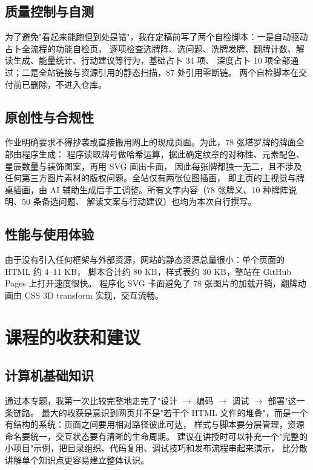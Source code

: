 \documentclass[supercite]{Experimental_Report}
\begin{document}
\subsection{质量控制与自测}

为了避免"看起来能跑但到处是错"，我在定稿前写了两个自检脚本：一是自动驱动占卜全流程的功能自检页，
逐项检查选牌阵、选问题、洗牌发牌、翻牌计数、解读生成、能量统计、行动建议等行为，基础占卜 34 项、
深度占卜 10 项全部通过；二是全站链接与资源引用的静态扫描，87 处引用零断链。
两个自检脚本在交付前已删除，不进入仓库。

\subsection{原创性与合规性}

作业明确要求不得抄袭或直接搬用网上的现成页面。为此，78 张塔罗牌的牌面全部由程序生成：
程序读取牌号做哈希运算，据此确定纹章的对称性、元素配色、星辰数量与装饰图案，再用 SVG 画出卡面，
因此每张牌都独一无二，且不涉及任何第三方图片素材的版权问题。全站仅有两张位图插画，
即主页的主视觉与牌桌插画，由 AI 辅助生成后手工调整。所有文字内容（78 张牌义、10 种牌阵说明、50 条备选问题、
解读文案与行动建议）也均为本次自行撰写。

\subsection{性能与使用体验}

由于没有引入任何框架与外部资源，网站的静态资源总量很小：单个页面的 HTML 约 4--11 KB，
脚本合计约 80 KB，样式表约 30 KB，整站在 GitHub Pages 上打开速度很快。
程序化 SVG 卡面避免了 78 张图片的加载开销，翻牌动画由 CSS 3D transform 实现，交互流畅。

\section{课程的收获和建议}

\subsection{计算机基础知识}

通过本专题，我第一次比较完整地走完了"设计 $\rightarrow$ 编码 $\rightarrow$ 调试 $\rightarrow$ 部署"这一条链路。
最大的收获是意识到网页并不是"若干个 HTML 文件的堆叠"，而是一个有结构的系统：页面之间要用相对路径彼此可达，
样式与脚本要分层管理，资源命名要统一，交互状态要有清晰的生命周期。
建议在讲授时可以补充一个"完整的小项目"示例，把目录组织、代码复用、调试技巧和发布流程串起来演示，
比分散讲解单个知识点更容易建立整体认识。
\end{document}
